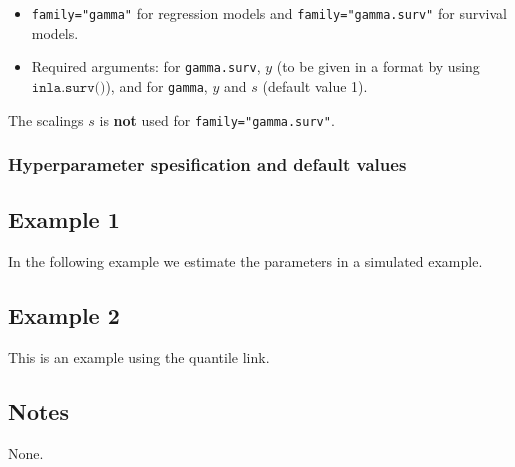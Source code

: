 \documentclass[a4paper,11pt]{article}
\begin{document}
\begin{itemize}
\item \texttt{family="gamma"} for regression models and
    \texttt{family="gamma.surv"} for survival models.
\item Required arguments: for \texttt{gamma.surv}, $y$ (to be given in
    a format by using $\texttt{inla.surv()}$), and for \texttt{gamma},
    $y$ and $s$ (default value 1).
\end{itemize}
The scalings $s$ is \textbf{not} used for \texttt{family="gamma.surv"}.

\subsubsection*{Hyperparameter spesification and default values}




\subsection*{Example 1}

In the following example we estimate the parameters in a simulated
example.


\subsection*{Example 2}

This is an example using the quantile link.


\subsection*{Notes}

None.
\end{document}
